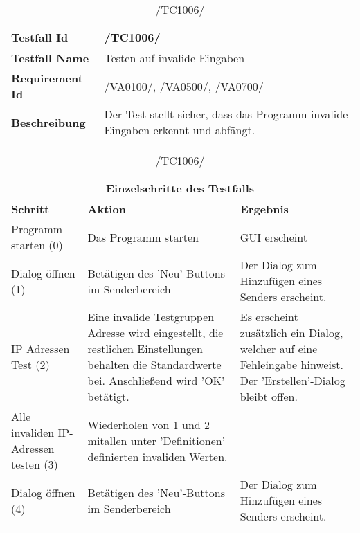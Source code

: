 \begin{table}[h]
\caption{/TC1006/}
\label{tab:TC1006}
\begin{center}
\begin{tabular}{|p{3.5cm}|p{9cm}|}
\hline
\textbf{Testfall Id} & /TC1006/\\
\hline
\textbf{Testfall Name} & Testen auf invalide Eingaben
\\
\hline
\textbf{Requirement Id} & /VA0100/, /VA0500/, /VA0700/\\
\hline
\textbf{Beschreibung} & Der Test stellt sicher, dass das Programm invalide
Eingaben erkennt und abfängt.\\
\hline
\end{tabular}
\begin{tabular}{|p{2.5cm}|p{5cm}|p{4.55cm}|}
\multicolumn{3}{|c|}{\textbf{Einzelschritte des Testfalls}} \\
\hline
\textbf{Schritt} & \textbf{Aktion} & \textbf{Ergebnis}\\
\hline
Programm starten (0) & Das Programm starten & GUI erscheint
\\
\hline
Dialog öffnen (1) & Betätigen des 'Neu'-Buttons im Senderbereich & Der Dialog
 zum Hinzufügen eines Senders erscheint.
\\
\hline
IP Adressen Test (2) & Eine invalide Testgruppen Adresse wird eingestellt, die
 restlichen Einstellungen behalten die Standardwerte bei. Anschließend wird 'OK' betätigt.
 & Es erscheint zusätzlich ein Dialog, welcher auf eine Fehleingabe hinweist.
 Der 'Erstellen'-Dialog bleibt offen.
\\
\hline
Alle invaliden IP-Adressen testen (3) & Wiederholen von 1 und 2 mitallen unter
'Definitionen' definierten invaliden Werten. &
\\
\hline
Dialog öffnen (4) & Betätigen des 'Neu'-Buttons im Senderbereich & Der Dialog
 zum Hinzufügen eines Senders erscheint.
\\
\hline
\end{tabular}
\end{center}
\end{table}

